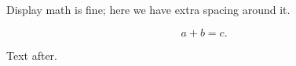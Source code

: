 \documentclass{article}
\begin{document}
Display math is fine; here we have extra spacing around it.

\[
  a + b = c.
\]

Text after.
\end{document}
